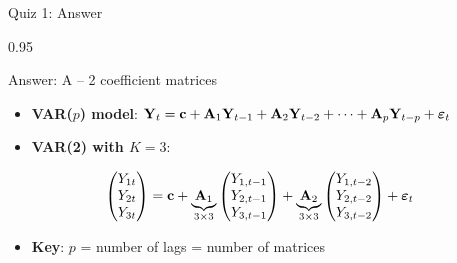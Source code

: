 \documentclass[9pt, aspectratio=169, t]{beamer}
\begin{document}
\begin{frame}{Quiz 1: Answer}
    \begin{cminipage}{0.95\textwidth}
    \begin{exampleblock}{Answer: A -- 2 coefficient matrices}
        \begin{itemize}\setlength{\itemsep}{0pt}
            \item \textbf{VAR($p$) model}: $\mathbf{Y}_t = \mathbf{c} + \mathbf{A}_1\mathbf{Y}_{t-1} + \mathbf{A}_2\mathbf{Y}_{t-2} + \cdots + \mathbf{A}_p\mathbf{Y}_{t-p} + \boldsymbol{\varepsilon}_t$
            \item \textbf{VAR(2) with $K=3$}:
        \end{itemize}
        \[
        \begin{pmatrix} Y_{1t} \\ Y_{2t} \\ Y_{3t} \end{pmatrix} = \mathbf{c} + \underbrace{\mathbf{A}_1}_{3\times 3}\begin{pmatrix} Y_{1,t-1} \\ Y_{2,t-1} \\ Y_{3,t-1} \end{pmatrix} + \underbrace{\mathbf{A}_2}_{3\times 3}\begin{pmatrix} Y_{1,t-2} \\ Y_{2,t-2} \\ Y_{3,t-2} \end{pmatrix} + \boldsymbol{\varepsilon}_t
        \]

        \begin{itemize}\setlength{\itemsep}{0pt}
            \item \textbf{Key}: $p$ = number of lags = number of matrices
        \end{itemize}
    \end{exampleblock}

    \end{cminipage}
\end{frame}
\end{document}

